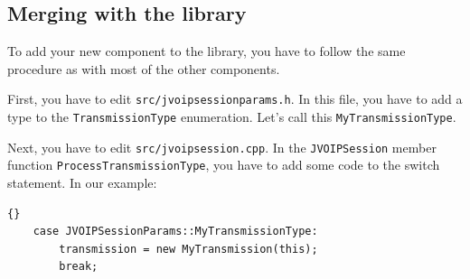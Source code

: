 		\subsection{Merging with the library}

		To add your new component to the library, you have to follow the same
		procedure as with most of the other components.

		First, you have to edit {\tt src/jvoipsessionparams.h}. In this file,
		you have to add a type to the {\tt TransmissionType} enumeration.
		Let's call this {\tt MyTransmissionType}.

		Next, you have to edit {\tt src/jvoipsession.cpp}. In the {\tt JVOIPSession}
		member function {\tt ProcessTransmissionType}, you have to add some code to
		the switch statement. In our example:
		\begin{lstlisting}[frame=tb]{}
	case JVOIPSessionParams::MyTransmissionType:
		transmission = new MyTransmission(this);
		break;
		\end{lstlisting}

